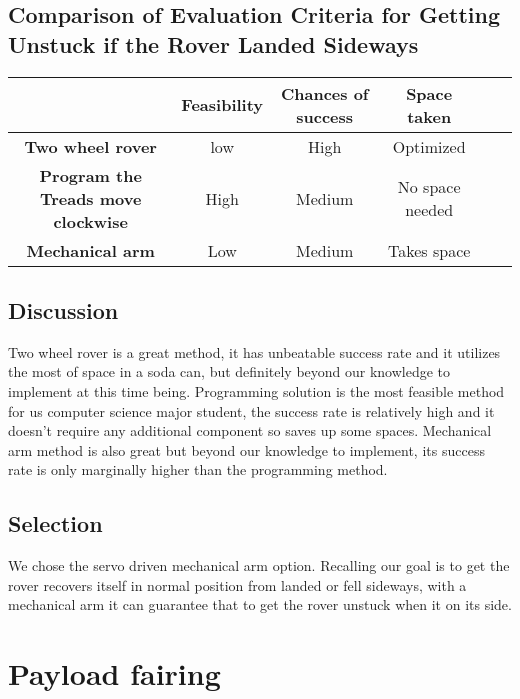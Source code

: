 \documentclass[10pt,letterpaper,onecolumn,journal]{IEEEtran}
\begin{document}
\subsection*{Comparison of Evaluation Criteria for Getting Unstuck if the Rover Landed Sideways}
\begin{center}
  \begin{tabular}{cccccc}
    \hline
    \multicolumn{1}{l}{} & \textbf{Feasibility} & \textbf{Chances of success}    & \textbf{Space taken} \\
		\hline
		\textbf{Two wheel rover}        				 & low         &  High                & Optimized \\
		\hline
		\textbf{Program the Treads move clockwise}    & High        & Medium		          &  No space needed \\
		\hline
		\textbf{Mechanical arm} 						 & Low         & Medium	              &  Takes space  \\
                \hline
	\end{tabular}
\end{center}
\vspace{.3cm}

\subsection{Discussion}
Two wheel rover is a great method, it has unbeatable success rate and it utilizes the most of space in a soda can, but definitely beyond our knowledge to implement at this time being. Programming solution is the most feasible method for us computer science major student, the success rate is relatively high and it doesn't require any additional component so saves up some spaces. Mechanical arm method is also great but beyond our knowledge to implement, its success rate is only marginally higher than the programming method. 

\subsection{Selection}
We chose the servo driven mechanical arm option. Recalling our goal is to get the rover recovers itself in normal position from landed or fell sideways, with a mechanical arm it can guarantee that to get the rover unstuck when it on its side. 

\section{Payload fairing}
\end{document}
